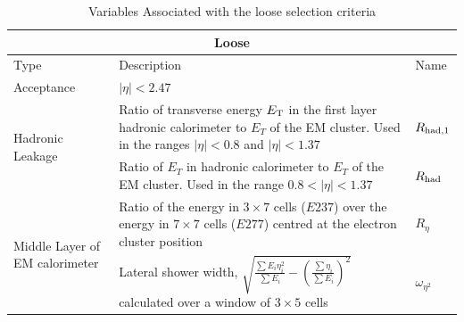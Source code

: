 \documentclass{article}
\begin{document}
\begin{table}[h!t]
\caption{ Variables Associated with the loose selection criteria \cite{ElectronPerformanceMeasurements}\label{table:looseVariables}}
\begin{tabular}{|p{5cm}|p{8cm}|p{1cm}| } 
\hline
\multicolumn{3}{|c|}{\textbf{Loose}}		\\\hline
Type&Description&Name		    \\\hline
Acceptance &  $|\eta|<2.47$ &  	\\\hline
\multirow{2}{*}{Hadronic Leakage} & Ratio of transverse energy $E_{\rm{T}}$ in the first layer hadronic calorimeter to $E_T$ of the EM cluster. Used in the ranges $|\eta|<0.8$ and $|\eta|<1.37$ & $R_{\rm{had,1}}$ \\\cline{2-3}
& Ratio of $E_T$ in hadronic calorimeter to $E_T$ of the EM cluster. Used in the range $0.8<|\eta|<1.37$ & $R_{\rm{had}}$\\\hline
\multirow{2}{*}{Middle Layer of EM calorimeter} & Ratio of the energy in $3\times7$ cells ($E237$) over the energy in $7\times7$ cells ($E277$) centred at the electron cluster position & $R_{\eta}$ \\\cline{2-3}
& Lateral shower width, $ \sqrt{\frac{\sum E_i \eta_{i}^{2}}{\sum E_i} - \left( \frac{\sum\eta_i}{\sum E_i} \right)^2 }$ calculated over a window of $3\times5$ cells & $\omega_{\eta^2}$ \\\hline
\end{tabular}
\end{table}
\end{document}
